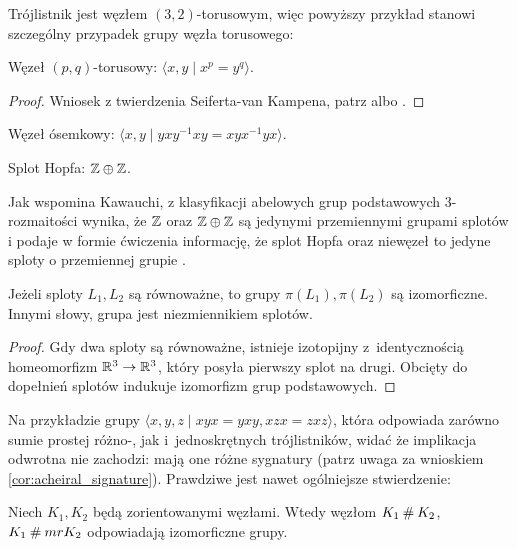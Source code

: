 Trójlistnik jest węzłem $(3, 2)$-torusowym, więc powyższy przykład stanowi szczególny przypadek grupy węzła torusowego:

\begin{example}
    Węzeł $(p,q)$-torusowy: $\langle x, y \mid x^p = y^q \rangle$.
\end{example}

\begin{proof}
    Wniosek z twierdzenia Seiferta-van Kampena, patrz \cite[s. 77]{kawauchi96} albo \cite[s. 47]{hatcher02}.
\end{proof}

\begin{example}
    Węzeł ósemkowy: $\langle x, y \mid yxy^{{-1}}xy=xyx^{{-1}}yx \rangle$.
\end{example}

\begin{example}
    Splot Hopfa: $\mathbb Z \oplus \mathbb Z$.
\end{example}

Jak wspomina Kawauchi, z klasyfikacji abelowych grup podstawowych 3-rozmaitości wynika, że $\mathbb Z$ oraz $\mathbb Z \oplus \mathbb Z$ są jedynymi przemiennymi grupami splotów i podaje w formie ćwiczenia informację, że splot Hopfa oraz niewęzeł to jedyne sploty o przemiennej grupie \cite[s. 83]{kawauchi96}.

\begin{proposition}
    \label{prop:knot_group_invariant}
    Jeżeli sploty $L_1, L_2$ są równoważne, to grupy $\pi(L_1), \pi(L_2)$ są izomorficzne.
    Innymi słowy, grupa jest niezmiennikiem splotów.
\end{proposition}

\begin{proof}
    Gdy dwa sploty są równoważne, istnieje izotopijny z~identycznością homeomorfizm $\mathbb R^3 \to \mathbb R^3$, który posyła pierwszy splot na drugi.
    Obcięty do dopełnień splotów indukuje izomorfizm grup podstawowych.
\end{proof}

Na przykładzie grupy $\langle x,y,z \mid xyx=yxy,xzx=zxz\rangle$, która odpowiada zarówno sumie prostej różno-, jak i~jednoskrętnych trójlistników, widać że implikacja odwrotna nie zachodzi: mają one różne sygnatury (patrz uwaga za wnioskiem \ref{cor:acheiral_signature}).
Prawdziwe jest nawet ogólniejsze stwierdzenie:

\begin{proposition}

    Niech $K_1, K_2$ będą zorientowanymi węzłami.
    Wtedy węzłom $K_1 \mathbin{\#} K_2$, $K_1 \mathbin{\#} mr K_2$ odpowiadają izomorficzne grupy.
\end{proposition}


